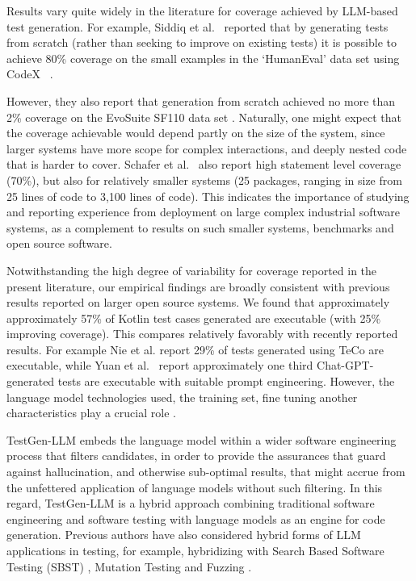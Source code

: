 \documentclass[sigconf,screen]{acmart}
\begin{document}
Results vary quite widely in the literature for coverage achieved by LLM-based test generation.
For example, Siddiq et al.~\cite{siddiq_exploring_2023}
reported that by generating tests from scratch (rather than seeking to improve on existing tests) it
is possible to achieve 80\% coverage on
the small examples in the `HumanEval'  data set using CodeX ~\cite{chen_evaluating_2021-short}.

However, they also report that generation from scratch achieved no more than 2\% coverage on the EvoSuite SF110 data set \cite{fraser:sf110}.
Naturally, one might expect that the coverage achievable would  depend partly on the size of the system, since larger systems have more scope for complex interactions, and deeply nested code that is harder to cover.
Schafer et al.~\cite{schafer_adaptive_2023} also report high statement level coverage (70\%), but also for relatively smaller systems (25 packages, ranging in size from 25 lines of code to 3,100 lines of code).
This indicates the importance of studying and reporting experience from deployment on large complex industrial software systems, 
as a  complement to results on such smaller systems, benchmarks and open source software.



Notwithstanding the high degree of variability for coverage reported in the present literature,
our empirical findings  are broadly consistent  with previous results reported on larger open source systems.
We found that approximately approximately 57\% of Kotlin test cases generated are executable (with 25\%  improving coverage).
This compares relatively favorably with recently reported results.
For example
Nie et al. \cite{nie:learning} report 29\% of tests generated using TeCo are executable,
while
Yuan et al.~\cite{yuan_no_2023}  report approximately one third Chat-GPT-generated  tests are executable with suitable prompt engineering.
However, the language model technologies used, the training set, fine tuning another characteristics play a crucial role \cite{mhetal:LLM-survey}.



TestGen-LLM embeds the language model within a wider software engineering process that filters candidates, in order to provide the assurances that guard against hallucination, and otherwise sub-optimal results, that might accrue from the unfettered application of language models without such filtering.
In this regard, TestGen-LLM is a hybrid approach combining traditional software engineering and software testing with language models as an engine for code generation.
Previous authors have also considered hybrid forms of LLM applications in testing, for example, hybridizing with Search Based Software Testing (SBST) \cite{lemieux_codamosa_nodate}, Mutation Testing \cite{moradi2023effective} and Fuzzing \cite{hu2023augmenting}.
\end{document}
